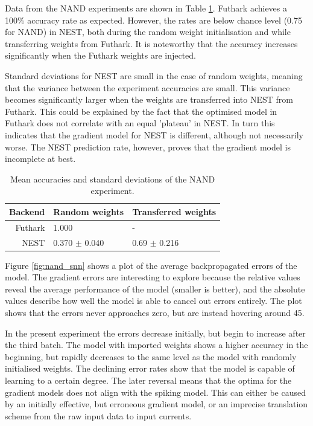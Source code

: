 \documentclass[report.tex]{subfiles}
\begin{document}
Data from the NAND experiments are shown in Table \ref{tab:nand}.
Futhark achieves a 100\% accuracy rate as expected.
However, the rates are below chance level (0.75 for NAND) in NEST, both during
the random weight initialisation and while transferring weights from Futhark.
It is noteworthy that the accuracy increases significantly when the Futhark weights are
injected.

Standard deviations for NEST are small in the case of random weights, meaning
that the variance between the experiment accuracies are small.
This variance becomes significantly larger when the weights are transferred into NEST from
Futhark.
This could be explained by the fact that the optimised model in Futhark does not
correlate with an equal 'plateau' in NEST. 
In turn this indicates that the gradient model for NEST is different, although
not necessarily worse.
The NEST prediction rate, however, proves that the gradient model is incomplete at
best.

\def\arraystretch{1.2}
\begin{table}
  \begin{tabular}{r|l l}
  Backend & Random weights & Transferred weights \\ \hline
  Futhark & 1.000 & - \\
  NEST & 0.370 $\pm$ 0.040 & 0.69 $\pm$ 0.216\\ 
  \end{tabular}
  \caption{Mean accuracies and standard deviations of the NAND experiment.}
  \label{tab:nand}
\end{table}

Figure \ref{fig:nand_snn} shows a plot of the average backpropagated errors of
the model.
The gradient errors are interesting to explore because the relative values reveal
the average performance of the model (smaller is better), and the absolute
values describe how well the model is able to cancel out errors entirely.
The plot shows that the errors never approaches zero, but are instead hovering
around 45.

In the present experiment the errors decrease initially, but begin to increase
after the third batch.
The model with imported weights shows a higher accuracy in the beginning, 
but rapidly decreases to the same level as the model with randomly initialised
weights.
The declining error rates show that the model is capable of learning to a
certain degree.
The later reversal means that the optima for the gradient models does not align
with the spiking model.
This can either be caused by an initially effective, but erroneous 
gradient model, or an imprecise translation scheme from the raw input data to
input currents.
\end{document}
